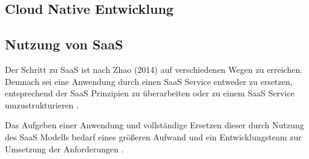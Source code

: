 \subsection{Cloud Native Entwicklung}

\subsection{Nutzung von SaaS}
Der Schritt zu \ac{SaaS} ist nach Zhao (2014) auf verschiedenen Wegen zu erreichen. Demnach sei eine Anwendung durch einen SaaS Service entweder zu ersetzen, entsprechend der SaaS Prinzipien zu überarbeiten oder zu einem \ac{SaaS} Service umzustrukturieren \cite[Vgl.][S. 144]{Zhao2014}.

Das Aufgeben einer Anwendung und vollständige Ersetzen dieser durch Nutzung des \ac{SaaS} Modells bedarf eines größeren Aufwand und ein Entwicklungsteam zur Umsetzung der Anforderungen \cite[Vgl.][]{CIO}. \pagebreak